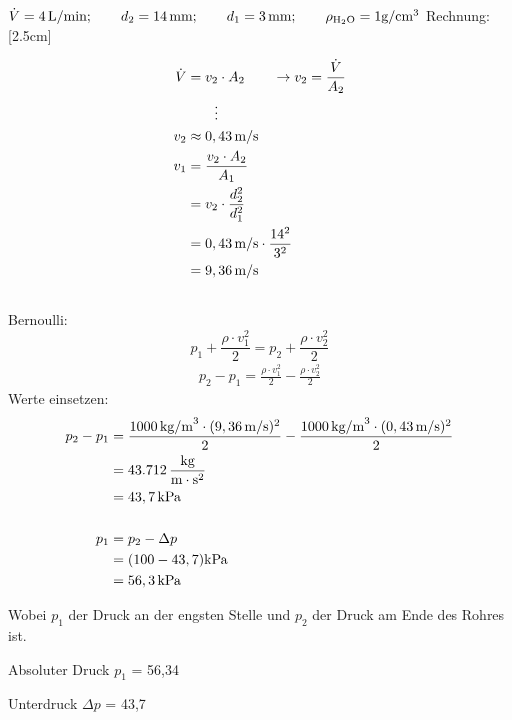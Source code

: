\documentclass[a4paper,10pt]{article}
\begin{document}
$\dot{V}=4 \mskip3mu \text{L/min} ; \qquad d_2 = 14 \mskip3mu \text{mm} ; \qquad d_1 = 3\mskip3mu \text{mm} ; \qquad \rho_{\text{H$_2$O}} = 1\text{g}/\text{cm}^3$ 
\pp
Rechnung:
\reversemarginpar
{}[2.5cm]

\begin{align*}
\dot{V} &= v_2 \cdot A_2 \qquad \rightarrow v_2 = \frac{\dot{V}}{A_2} \\
&\qquad \vdots \\
v_2 &\approx 0,43\mskip3mu \text{m}/\text{s}\\ 
v_1 &= \frac{v_2 \cdot A_2}{A_1}\\
&= v_2 \cdot \frac{d_2^2}{d_1^2} \\
&= 0,43\mskip3mu \text{m/s} \cdot \frac{14^2}{3^2} \\
&=9,36\mskip3mu \text{m/s} \\ \\
\end{align*}
Bernoulli:
\begin{equation}
p_1 + \frac{\rho \cdot v_1^2}{2} = p_2 + \frac{\rho \cdot v_2^2}{2}
\end{equation}
\begin{align*}
p_2 - p_1 = \frac{\rho \cdot v_1^2}{2} -  \frac{\rho \cdot v_2^2}{2} 
\end{align*}
Werte einsetzen: 
\begin{align*}
p_2 - p_1 &= \frac{1000 \mskip3mu \text{kg/m}^3 \cdot (9,36\mskip3mu \text{m/s} )^2}{2} -  \frac{1000 \mskip3mu \text{kg/m}^3 \cdot (0,43 \mskip3mu \text{m/s} )^2}{2} \\
&= 43.712 \mskip3mu \frac{\text{kg}}{\text{m} \cdot \text{s}^2} \\
&= 43,7 \mskip3mu \text{kPa} \\ \\
p_1 &= p_2 - \Delta p \\
	&= (100 - 43,7)\text{kPa}\\ &= 56,3\mskip3mu \text{kPa}
\end{align*}
\pp
\marginnote[Gesamtdruck = $p_0$]

Wobei $p_1$ der Druck an der engsten Stelle und $p_2$ der Druck am Ende des Rohres ist.\par
Absoluter Druck $p_1$ = 56,34  \par 
Unterdruck $\Delta p$ = 43,7  \par 
\end{document}
